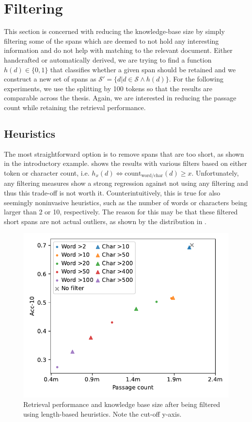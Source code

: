 \section{Filtering}

This section is concerned with reducing the knowledge-base size by simply filtering some of the spans which are deemed to not hold any interesting information and do not help with matching to the relevant document.
Either handcrafted or automatically derived, we are trying to find a function $h(d) \in \{0,1\}$ that classifies whether a given span should be retained and we construct a new set of spans as $\mathcal{S}' = \{d|d\in \mathcal{S} \wedge h(d)\}$.
For the following experiments, we use the splitting by 100 tokens so that the results are comparable across the thesis.
Again, we are interested in reducing the passage count while retaining the retrieval performance.

\subsection{Heuristics}

The most straightforward option is to remove spans that are too short, as shown in the introductory example.
 shows the results with various filters based on either token or character count, i.e. $h_x(d) \Leftrightarrow \text{count}_\text{word/char}(d) \geq x$.
Unfortunately, any filtering measures show a strong regression against not using any filtering and thus this trade-off is not worth it.
Counterintuitively, this is true for also seemingly noninvasive heuristics, such as the number of words or characters being larger than 2 or 10, respectively.
The reason for this may be that these filtered short spans are not actual outliers, as shown by the distribution in .

\begin{figure}[ht]
    \center
    \includegraphics[width=0.7\linewidth]{img/filter_intro.pdf}
    
    \caption{Retrieval performance and knowledge base size after being filtered using length-based heuristics. Note the cut-off y-axis.}
    \label{fig:filter_intro}
\end{figure}


